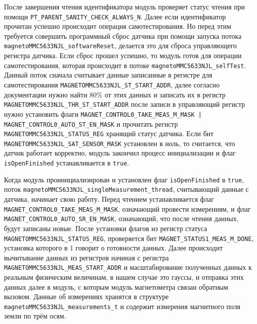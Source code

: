 После завершения чтения идентификатора модуль проверяет статус чтения при помощи \lstinline{PT_PARENT_SANITY_CHECK_ALWAYS_N}. Далее
если идентификатор прочитан успешно происходит операция самотестирования. Но перед этим требуется совершить программный сброс датчика
при помощи запуска потока \lstinline{magnetoMMC5633NJL_softwareReset},
делается это для сброса управляющего регистра датчика. Если сброс прошел успешно, то модуль готов для операции самотестирования, 
которая происходит в потоке \lstinline{magnetoMMC5633NJL_selfTest}.
Данный поток сначала считывает данные записанные в регистре для самотестирования \lstinline{MAGNETOMMC5633NJL_ST_START_ADDR},
далее согласно документации 
нужно найти 80\% от этих данных и записать их в регистр \lstinline{MAGNETOMMC5633NJL_THR_ST_START_ADDR} после записи в управляющий 
регистр нужно установить флаги
\lstinline{MAGNET_CONTROL0_TAKE_MEAS_M_MASK | MAGNET_CONTROL0_AUTO_ST_EN_MASK}
и прочитать регистр \lstinline{MAGNETOMMC5633NJL_STATUS_REG} хранящий статус датчика.
Если
бит \lstinline{MAGNETOMMC5633NJL_SAT_SENSOR_MASK} установлен в ноль, то считается,
что датчик работает корректно, модуль закончил процесс инициализации и флаг \lstinline{isOpenFinished} устанавливается в \lstinline{true}.

Когда модуль проинициализирован и установлен флаг \lstinline{isOpenFinished} в \lstinline{true}, поток \lstinline{magnetoMMC5633NJL_singleMeasurement_thread},
считывающий данные с датчика, начинает свою работу. Перед чтением устанавливается флаг \lstinline{MAGNET_CONTROL0_TAKE_MEAS_M_MASK}, означающий провести измерениям,
и флаг \lstinline{MAGNET_CONTROL0_AUTO_SR_EN_MASK}, означающий, что после чтения данных, будут записаны новые. После установки флагов
из регистр статуса \lstinline{MAGNETOMMC5633NJL_STATUS_REG}, проверяется бит \lstinline{MAGNET_STATUS1_MEAS_M_DONE}, установка которого в 1 говорит о
готовности данных. Далее происходит вычитывание данных из регистров начиная с регистра \lstinline{MAGNETOMMC5633NJL_MEAS_START_ADDR} и масштабирование полученных данных
к реальным физическим величинам, в нашем случае это гауссы, и отправка этих данных далее в модуль, с которым модуль магнетометра связан обратным вызовом.
Данные об измерениях хранятся в структуре \lstinline{magnetoMMC5633NJL_measurements_t} и содержит измерения магнитного поля земли по трём осям.


